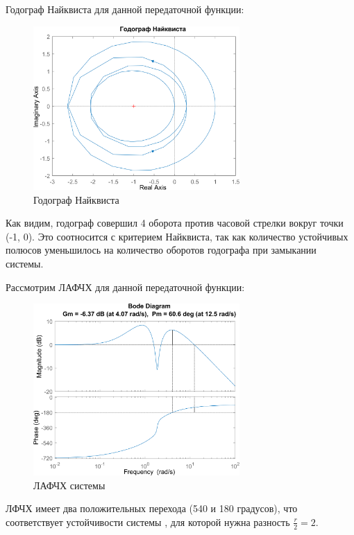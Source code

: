 Годограф Найквиста для данной передаточной функции:
\begin{figure}[H]
    \centering
    \includegraphics[width=0.7\textwidth, trim={0cm 0cm 0cm 0cm}]{../images/1_3_hod.png}
    \caption{Годограф Найквиста}
\end{figure}

Как видим, годограф совершил 4 оборота против часовой стрелки вокруг точки (-1, 0). Это соотносится с критерием Найквиста, так как
количество устойчивых полюсов уменьшилось на количество оборотов годографа при замыкании системы.

Рассмотрим ЛАФЧХ для данной передаточной функции:
\begin{figure}[H]
    \centering
    \includegraphics[width=0.7\textwidth, trim={0cm 0cm 0cm 0cm}]{../images/1_3_lapfs.png}
    \caption{ЛАФЧХ системы}
\end{figure}

ЛФЧХ имеет два положительных перехода (540 и 180 градусов), что соответствует устойчивости системы
, для которой нужна разность \(\frac{r}{2} = 2\).


\endinput